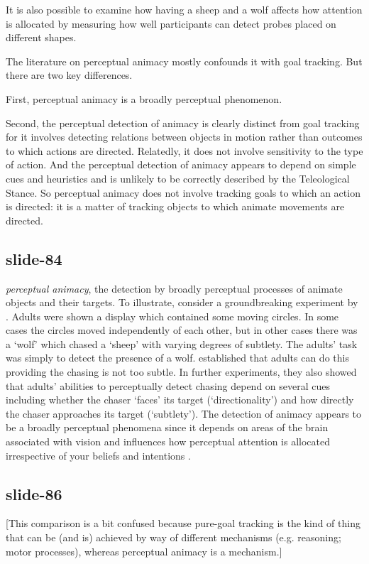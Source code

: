 \documentclass[12pt,\papersize]{extarticle}
\begin{document}
It is also possible to examine how having a sheep and a wolf affects how attention is allocated by
measuring how well participants can detect probes placed on different shapes.
 
 
The literature on perceptual animacy mostly confounds it with goal tracking.
But there are two key differences.
 
First, perceptual animacy is a broadly
perceptual phenomenon.
 
Second,
the perceptual detection of animacy is clearly distinct from goal tracking
for it involves detecting relations between objects in motion rather than
outcomes to which actions are directed.
Relatedly, it does not involve sensitivity to the type of action.
And the perceptual detection of animacy appears to depend on simple cues
and heuristics and is unlikely to be correctly described by the
Teleological Stance.
So perceptual animacy does not involve tracking goals to which an action is
directed: it is a matter of tracking objects to which animate movements are
directed.
 
\subsection{slide-84}
\emph{{perceptual animacy}},
the detection by broadly perceptual processes of animate objects and their targets.
To illustrate, consider a groundbreaking experiment by \citet[experiment 1]{gao:2009_psychophysics}.
Adults were shown a display which contained some moving circles.
In some cases the circles moved independently of each other, but in other cases there was a ‘wolf’
which chased a ‘sheep’ with varying degrees of subtlety.
The adults’ task was simply to detect the presence of a wolf.
\citeauthor{gao:2009_psychophysics} established that adults can do this providing the chasing is not too subtle.
In further experiments, they also showed that adults’ abilities to perceptually detect chasing
depend on several cues including whether the chaser ‘faces’ its target (‘directionality’) and how
directly the chaser approaches its target (‘subtlety’).
The detection of animacy appears to be a broadly perceptual phenomena since it depends on areas of
the brain associated with vision and influences how perceptual attention is allocated
\citep{scholl:2013_perceiving} irrespective of your beliefs and intentions
\citep{buren:2016_automaticity}.
 
\subsection{slide-86}
[This comparison is a bit confused because pure-goal tracking is the kind of thing 
that can be (and is) achieved by way of different mechanisms (e.g. reasoning; motor processes),
whereas perceptual animacy is a mechanism.]
 
\end{document}
